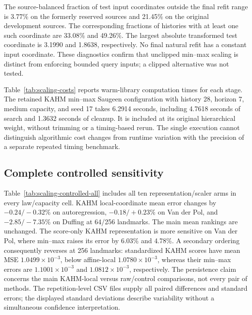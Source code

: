 



\FloatBarrier

The source-balanced fraction of test input coordinates outside the final
refit range is 3.77\% on the formerly reserved sources and 21.45\% on the
original development sources. The corresponding fractions of histories
with at least one such coordinate are 33.08\% and 49.26\%. The largest
absolute transformed test coordinate is 3.1990 and 1.8638, respectively.
No final natural refit has a constant input coordinate. These diagnostics
confirm that unclipped min--max scaling is distinct from enforcing bounded
query inputs; a clipped alternative was not tested.

Table~\ref{tab:scaling-costs} reports warm-library computation times
for each stage.
The retained KAHM min--max Saugeen configuration with history 28, horizon 7,
medium capacity, and seed 17 takes 6.2914 seconds, including 4.7618 seconds
of search and 1.3632 seconds of cleanup. It is included at its original
hierarchical weight, without trimming or a timing-based rerun. The single
execution cannot distinguish algorithmic cost changes from runtime variation
with the precision of a separate repeated timing benchmark.


\FloatBarrier

\clearpage
\subsection{Complete controlled sensitivity}
Table~\ref{tab:scaling-controlled-all} includes all ten representation/scaler
arms in every law/capacity cell. KAHM local-coordinate mean error changes
by $-0.24/-0.32$\% on autoregression, $-0.18/+0.23$\% on Van der Pol,
and $-2.85/-7.35$\% on Duffing at 64/256 landmarks. The main mean rankings
are unchanged. The score-only KAHM representation is more sensitive on
Van der Pol, where min--max raises its error by 6.03\% and 4.78\%.
A secondary ordering consequently reverses at 256 landmarks: standardized
KAHM scores have mean MSE $1.0499\times10^{-3}$, below affine-local
$1.0780\times10^{-3}$, whereas their min--max errors are $1.1001\times10^{-3}$
and $1.0812\times10^{-3}$, respectively. The persistence claim concerns the
main KAHM-local versus raw/control comparisons, not every pair of methods.
The repetition-level CSV files supply all paired differences and
standard errors; the displayed standard deviations describe variability
without a simultaneous confidence interpretation.


